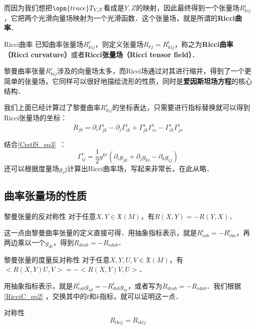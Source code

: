 而因为我们想把$\opn{trace}T_{Y, Z}$看成是$Y, Z$的映射，因此最终得到一个张量场$R^i_{kij}$，它把两个光滑向量场映射为一个光滑函数．这个张量场，就是所谓的\textbf{Ricci曲率}．

\begin{definition}{Ricci曲率}
已知曲率张量场$R^r_{kij}$，则定义张量场$R_{kj}=R^i_{kij}$，称之为\textbf{Ricci曲率（Ricci curvature）}或者\textbf{Ricci张量场（Ricci tensor field）}．
\end{definition}

黎曼曲率张量$R^r_{kij}$涉及的向量场太多，而Ricci场通过对其进行缩并，得到了一个更简单的张量场，它同样可以很好地描绘流形的性质，同时是\textbf{爱因斯坦场方程}的核心结构．

我们上面已经计算过了黎曼曲率$R^r_{kij}$的坐标表达，只需要进行指标替换就可以得到Ricci张量场的坐标：
\begin{equation}
R_{jk}=\partial_i\Gamma^i_{jk}-\partial_j\Gamma^{i}_{ik}+\Gamma^s_{jk}\Gamma^i_{is}-\Gamma^s_{ik}\Gamma^i_{js}
\end{equation}

结合\autoref{CrstfS_eq3}~：
\begin{equation}
\Gamma^{r}_{ij}=\frac{1}{2}g^{kr}(\partial_ig_{jk}+\partial_jg_{ki}-\partial_kg_{ij})
\end{equation}
还可以根据度量场$g_ij$计算出Ricci曲率场，写起来非常长，在此从略．














\subsection{曲率张量场的性质}

\begin{theorem}{黎曼张量的反对称性}
对于任意$X, Y\in\mathfrak{X}(M)$，有$R(X, Y)=-R(Y, X)$．
\end{theorem}


这一点由黎曼曲率张量的定义直接可得．用抽象指标表示，就是$R^i_{cab}=-R^i_{cba}$，再两边乘以一个$g_{di}$，得到$R_{dcab}=-R_{cdab}$．





\begin{theorem}{黎曼张量的度量反对称性}
对于任意$X, Y, U, V\in\mathfrak{X}(M)$，有$<R(X, Y)U, V>=-<R(X, Y)V, U>$．


\end{theorem}

用抽象指标表示，就是$R^i_{cab}g_{id}=-R^i_{dab}g_{ic}$，或者写为$R_{dcab}=-R_{cdab}$．我们根据\autoref{RicciC_eq2} ，交换其中的$t$和$k$指标，就可以证明这一点．

\begin{theorem}{对称性}
\begin{equation}
R_{tkij}=R_{iktj}
\end{equation}
\end{theorem}





















